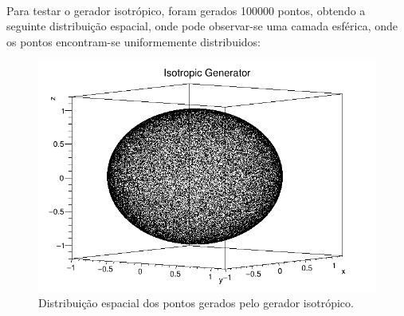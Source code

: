 \documentclass[a4paper, 12pt]{article} %
\begin{document}
	\paragraph{} Para testar o gerador isotrópico, foram gerados 100000 pontos, obtendo a seguinte distribuição espacial, onde pode observar-se uma camada esférica, onde os pontos encontram-se uniformemente distribuidos:
	\begin{figure}[H]
		\centering
		\includegraphics[width=0.45\linewidth]{isotropic2.png}
		\caption{Distribuição espacial dos pontos gerados pelo gerador isotrópico.}
	\end{figure}

	
\end{document}
